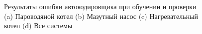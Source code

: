 \begin{figure}[H]
  \centering
  \caption{Результаты ошибки автокодировщика при обучении и проверки\\(a) Пароводяной котел (b) Мазутный насос (c) Нагревательный котел (d) Все системы}\label{fig:test:plot:learning:encoder}
\end{figure}

